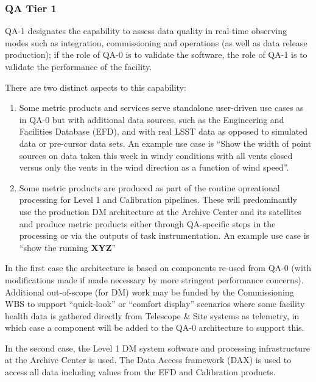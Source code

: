 \subsubsection{QA Tier 1}

QA-1 designates the capability to assess data quality in real-time observing modes such as integration, commissioning and operations (as well as data release production); if the role of QA-0 is to validate the software, the role of QA-1 is to validate the performance of the facility.

There are two distinct aspects to this capability:

\begin{enumerate}
\item Some metric products and services serve standalone user-driven use cases as in QA-0 but with additional data sources, such as the Engineering and Facilities Database (EFD), and with real LSST data as opposed to simulated data or pre-cursor data sets.  An example use case is ``Show the width of point sources on data taken this week in windy conditions with all vents closed versus only the vents in the wind direction as a function of wind speed''.

\item Some metric products are produced as part of the routine opreational processing for Level 1 and Calibration pipelines. These will predominantly use the production DM architecture at the Archive Center and its satellites and produce metric products either through QA-specific steps in the processing or via the outputs of task instrumentation. An example use case is ``show the running {\bf XYZ}'' 

\end{enumerate}

In the first case the architecture is based on components re-used from QA-0 (with modifications made if made necessary by more stringent performance concerns). Additional out-of-scope (for DM) work may be funded by the Commissioning WBS to support ``quick-look'' or ``comfort display'' scenarios where some facility health data is gathered directly from Telescope \& Site systems as telemetry, in which case a component will be added to the QA-0 architecture to support this.

In the second case, the Level 1 DM system software and processing infrastructure at the Archive Center is used. The Data Access framework (DAX) is used to access all data including values from the EFD and Calibration products.

